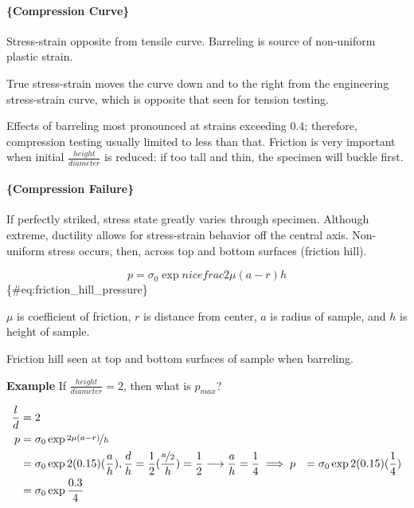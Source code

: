 \documentclass[
]{article}
\begin{document}
\hypertarget{compression-curve}{%
\paragraph{\{Compression Curve\}}\label{compression-curve}}

Stress-strain opposite from tensile curve. Barreling is source of
non-uniform plastic strain.

{True stress-strain moves the curve down and to the right from the
engineering stress-strain curve, which is opposite that seen for tension
testing.}

\noindent Effects of barreling most pronounced at strains exceeding 0.4;
therefore, compression testing usually limited to less than that.
Friction is very important when initial \(\frac{height}{diameter}\) is
reduced: if too tall and thin, the specimen will buckle first.

\hypertarget{compression-failure}{%
\paragraph{\{Compression Failure\}}\label{compression-failure}}

If perfectly striked, stress state greatly varies through specimen.
Although extreme, ductility allows for stress-strain behavior off the
central axis. Non-uniform stress occurs, then, across top and bottom
surfaces (friction hill).

\[ p = \sigma_{0}\exp{nicefrac{2\mu(a - r)}{h}} \]
\{\#eq:friction\_hill\_pressure\}

\noindent \(\mu\) is coefficient of friction, \(r\) is distance from
center, \(a\) is radius of sample, and \(h\) is height of sample.

{Friction hill seen at top and bottom surfaces of sample when
barreling.}

\textbf{Example} If \(\frac{height}{diameter} = 2\), then what is
\(p_{max}\)?

\begin{align*}
    \frac{l}{d}     &= 2 \\
    p   &= \sigma_{0}\exp{\nicefrac{2\mu(a - r)}{h}} \\
    &= \sigma_{0}\exp{2(0.15)(\frac{a}{h})}, \frac{d}{h} = \frac{1}{2}(\frac{\nicefrac{a}{2}}{h}) = \frac{1}{2} \longrightarrow \frac{a}{h} = \frac{1}{4}
    \implies p  &= \sigma_{0}\exp{2(0.15)(\frac{1}{4})} \\
    &= \sigma_{0}\exp{\frac{0.3}{4}}
\end{align*}
\end{document}
